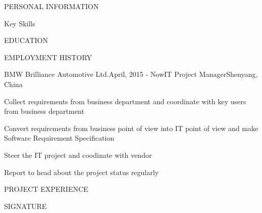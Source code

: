 \documentclass{myresume_en}
\begin{document}
\begin{rSection}{PERSONAL INFORMATION}
\end{rSection}

\begin{rSection}{Key Skills}
\end{rSection}

\begin{rSection}{EDUCATION}
\end{rSection}

\begin{rSection}{EMPLOYMENT HISTORY}
\begin{rExperience}{BMW Brilliance Automotive Ltd.}{April, 2015 - Now}{IT Project Manager}{Shenyang, China}
\item Collect requirements from business department and coordinate with key users from business department
\item Convert requirements from business point of view into IT point of view and make Software Requirement Specification
\item Steer the IT project and coodinate with vendor
\item Report to head about the project status regularly
\end{rExperience}

\end{rSection}
\begin{rSection}{PROJECT EXPERIENCE}
\end{rSection}

\begin{rSection}{SIGNATURE}
\end{rSection}
\end{document}

